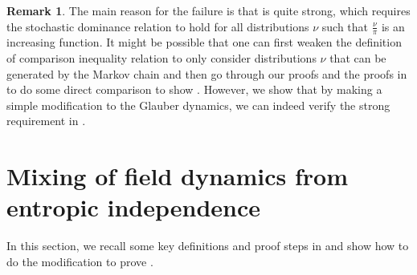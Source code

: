 \documentclass[11pt,a4paper]{article}
\theoremstyle{definition}
\newtheorem{remark}[theorem]{Remark}
\begin{document}
\begin{remark}
    The main reason for the failure is that  is quite strong, which requires the stochastic dominance relation to hold for all distributions $\nu$ such that $\frac{\nu}{\pi}$ is an increasing function. It might be possible that one can first weaken the definition of comparison inequality relation to only consider distributions $\nu$ that can be generated by the Markov chain and then go through our proofs and the proofs in \cite{FillK13} to do some direct comparison to show . However, we show that by making a simple modification to the Glauber dynamics, we can indeed verify the strong requirement in .
\end{remark}


\section{Mixing of field dynamics from entropic independence}\label{sec:mixing-of-field-dynamics-from-entropic-independence}

In this section, we recall some key definitions and proof steps in \cite{Chen0Y23} and show how to do the modification to prove .
\end{document}
